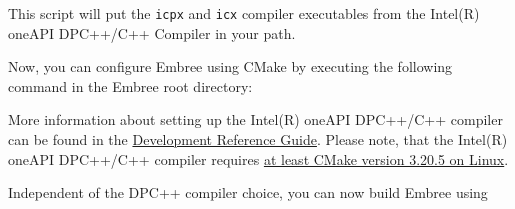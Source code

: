 \begin{Shaded}
\begin{Highlighting}[]
\OperatorTok{/}\OperatorTok{/}\OperatorTok{/}\OperatorTok{/}\OperatorTok{/}\OperatorTok{/}\OperatorTok{/}
\end{Highlighting}
\end{Shaded}

This script will put the \texttt{icpx} and \texttt{icx} compiler
executables from the Intel(R) oneAPI DPC++/C++ Compiler in your path.

Now, you can configure Embree using CMake by executing the following
command in the Embree root directory:

\begin{Shaded}
\begin{Highlighting}[]
\OperatorTok{{-}}
      \OperatorTok{{-}}\OperatorTok{=}
      \OperatorTok{{-}}\OperatorTok{=}
      \OperatorTok{{-}}\OperatorTok{=}
\end{Highlighting}
\end{Shaded}

More information about setting up the Intel(R) oneAPI DPC++/C++ compiler
can be found in the
\href{https://www.intel.com/content/www/us/en/develop/documentation/oneapi-dpcpp-cpp-compiler-dev-guide-and-reference/top/compiler-setup.html}{Development
Reference Guide}. Please note, that the Intel(R) oneAPI DPC++/C++
compiler requires
\href{https://www.intel.com/content/www/us/en/develop/documentation/oneapi-dpcpp-cpp-compiler-dev-guide-and-reference/top/compiler-setup/use-the-command-line/use-cmake-with-the-compiler.html}{at
least CMake version 3.20.5 on Linux}.

Independent of the DPC++ compiler choice, you can now build Embree using

\begin{Shaded}
\begin{Highlighting}[]
\OperatorTok{{-}{-}}\OperatorTok{{-}}
\end{Highlighting}
\end{Shaded}

